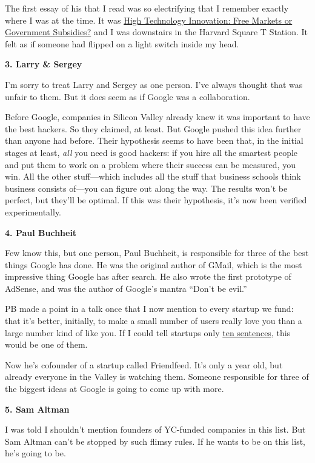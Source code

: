 \documentclass[12pt]{book}
\begin{document}
The first essay of his that I read was so electrifying that I remember
exactly where I was at the time. It was
\href{http://www.cypress.com/?rID=34993}{High Technology Innovation:
Free Markets or Government Subsidies?} and I was downstairs in the
Harvard Square T Station. It felt as if someone had flipped on a light
switch inside my head.

\textbf{3. Larry \& Sergey}

I'm sorry to treat Larry and Sergey as one person. I've always thought
that was unfair to them. But it does seem as if Google was a
collaboration.

Before Google, companies in Silicon Valley already knew it was important
to have the best hackers. So they claimed, at least. But Google pushed
this idea further than anyone had before. Their hypothesis seems to have
been that, in the initial stages at least, \emph{all} you need is good
hackers: if you hire all the smartest people and put them to work on a
problem where their success can be measured, you win. All the other
stuff---which includes all the stuff that business schools think
business consists of---you can figure out along the way. The results
won't be perfect, but they'll be optimal. If this was their hypothesis,
it's now been verified experimentally.

\textbf{4. Paul Buchheit}

Few know this, but one person, Paul Buchheit, is responsible for three
of the best things Google has done. He was the original author of GMail,
which is the most impressive thing Google has after search. He also
wrote the first prototype of AdSense, and was the author of Google's
mantra ``Don't be evil.''

PB made a point in a talk once that I now mention to every startup we
fund: that it's better, initially, to make a small number of users
really love you than a large number kind of like you. If I could tell
startups only \href{13sentences.html}{ten sentences}, this would be one
of them.

Now he's cofounder of a startup called Friendfeed. It's only a year old,
but already everyone in the Valley is watching them. Someone responsible
for three of the biggest ideas at Google is going to come up with more.

\textbf{5. Sam Altman}

I was told I shouldn't mention founders of YC-funded companies in this
list. But Sam Altman can't be stopped by such flimsy rules. If he wants
to be on this list, he's going to be.
\end{document}
